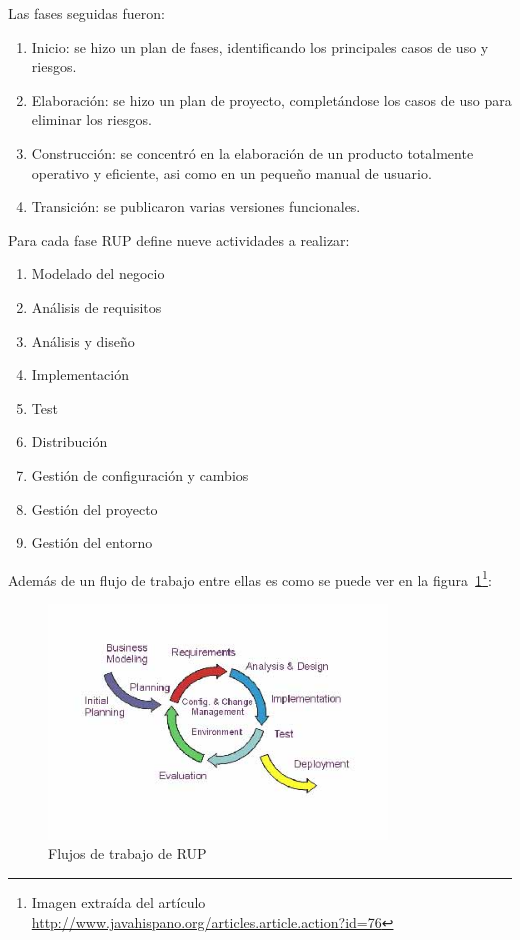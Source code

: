 Las fases seguidas fueron:

\begin{enumerate}
  \item Inicio: se hizo un plan de fases, identificando los principales 
	casos de uso y riesgos.
  \item Elaboración: se hizo un plan de proyecto, completándose los casos 
	de uso para eliminar los riesgos.
  \item Construcción: se concentró en la elaboración de un producto totalmente 
	operativo y eficiente, asi como en un pequeño manual de usuario.
  \item Transición: se publicaron varias versiones funcionales.
\end{enumerate}

Para cada fase RUP define nueve actividades a realizar:

\begin{enumerate}
 \item Modelado del negocio
 \item Análisis de requisitos
 \item Análisis y diseño
 \item Implementación
 \item Test
 \item Distribución
 \item Gestión de configuración y cambios
 \item Gestión del proyecto
 \item Gestión del entorno
\end{enumerate}

Además de un flujo de trabajo entre ellas es como se puede ver en la 
figura~\ref{fig:RUPWorkflow}\footnote{Imagen extraída del artículo
\url{http://www.javahispano.org/articles.article.action?id=76}}:

\begin{figure}[ht]
	\centering
	\includegraphics[width=9cm]{images/workflow-rup.png}
	\caption{Flujos de trabajo de RUP}
	\label{fig:RUPWorkflow}
\end{figure}

